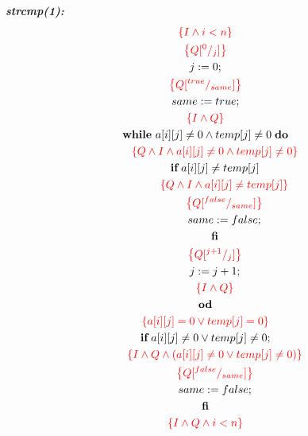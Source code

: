 \documentclass [a4paper, 12pt, fleqn]  {article}
\newcommand{\assn}[1]{{\color{red}\left\{#1\right\}}}
\begin{document}
\textit{\textbf{strcmp(1):}}
\begin{gather*}
\assn{ I \AND i < n } \\
\assn{ Q \subst 0j  } \\
j \Ass 0; \\
\assn{  Q \subst {true} {same}  } \\
same \Ass true; \\
\assn{  I \AND Q} \\
\WHILE ~ a[i][j] \neq 0 \AND temp[j] \neq 0 \hspace{0.1cm} \DO \\
\hspace{0.6cm} \assn{ Q \AND I \AND a[i][j] \neq 0 \AND temp[j] \neq 0  } \\
\hspace{0.6cm} \IF \hspace{0.1cm} a[i][j] \neq temp[j] \\
\hspace{1.2cm} \assn {Q \AND I \AND a[i][j] \neq temp[j]} \\
\hspace{1.2cm} \assn{  Q \subst {false} {same} } \\
\hspace{1.2cm} same \Ass false; \\
\hspace{0.6cm} \FI \\
\hspace{0.6cm} \assn{ Q \subst {j + 1} j  } \\
\hspace{0.6cm} j \Ass j + 1; \\
\hspace{0.6cm} \assn {I \AND Q} \\
\OD \\
\assn{  a[i][j] = 0 \OR temp[j] = 0   } \\
\IF \hspace{0.1cm} a[i][j] \neq 0 \OR temp[j] \neq 0; \\
\hspace{0.6cm} \assn{  I \AND Q \AND (a[i][j] \neq 0 \OR temp[j] \neq 0)  } \\
\hspace{0.6cm} \assn{ Q \subst {false} {same} } \\
\hspace{0.6cm} same \Ass false; \\
\FI \\
\assn{ I \AND Q \AND i < n  } \\
\end{gather*}
\end{document}
